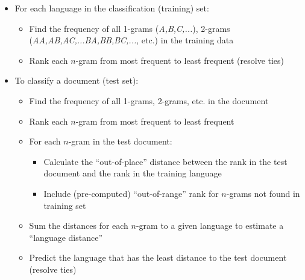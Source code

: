 \documentclass[a4paper,landscape,headrule,footrule,xetex]{foils}
\begin{document}
\begin{itemize}
  \item For each language in the classification (training) set:
  \begin{itemize}
    \item Find the frequency of all 1-grams (\textit{A,B,C,...}),
      2-grams (\textit{AA,AB,AC,...BA,BB,BC,...}, etc.) in the training
      data 
    \item Rank each $n$-gram from most frequent to least frequent (resolve ties)
  \end{itemize}
  
  \newpage

  \item To classify a document (test set):
  \begin{itemize}
    \item Find the frequency of all 1-grams, 2-grams, etc. in the document
    \item Rank each $n$-gram from most frequent to least frequent
    \item For each $n$-gram in the test document:
    \begin{itemize}
      \item Calculate the ``out-of-place'' distance between the rank in
        the test document and the rank in the training language
      \item Include (pre-computed) ``out-of-range'' rank for $n$-grams
        not found in training set
    \end{itemize}
    \item Sum the distances for each $n$-gram to a given language to estimate a ``language distance''
    \item Predict the language that has the least distance to the test document (resolve ties)
  \end{itemize}
\end{itemize}


\end{document}
